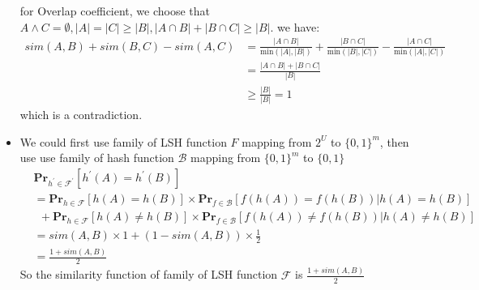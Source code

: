 \documentclass[12pt]{article}
\newenvironment{solution}[2][Solution]{\begin{trivlist}
\item[\hskip \labelsep {\bfseries #1}\hskip \labelsep {\bfseries #2.}]}{\end{trivlist}}
\begin{document}
\begin{solution}{3}
\begin{itemize}
              for Overlap coefficient, we choose that $A \land C = \emptyset, |A|=|C| \ge |B|, |A \cap B| + |B \cap C| \ge |B|$. we have:
              \begin{align*}
                  sim(A, B) + sim(B, C) - sim(A, C) & = \frac{|A \cap B|}{\text{min}(|A|,|B|)} + \frac{|B \cap C|}{\text{min}(|B|,|C|)} - \frac{|A \cap C|}{\text{min}(|A|,|C|)} \\
                                                    & = \frac{|A \cap B| + |B \cap C|}{|B|}                                                                                      \\
                                                    & \ge \frac{|B|}{|B|} = 1
              \end{align*}
              which is a contradiction.
        \item We could first use family of LSH function $F$ mapping from $2^U$ to $\{0,1\}^m$, then use use family of hash function $\mathcal{B}$
              mapping from $\{0,1\}^m$ to $\{0,1\}$
              \begin{align*}
                   & \mathbf{Pr}_{h^\prime \in \mathcal{F}^\prime}[h^\prime(A) = h^\prime(B)]                                                          \\
                   & = \mathbf{Pr}_{h \in \mathcal{F}}[h(A) = h(B)] \times \mathbf{Pr}_{f \in \mathcal{B}}[f(h(A)) = f(h(B))|h(A) = h(B)]              \\
                   & ~ ~ + \mathbf{Pr}_{h \in \mathcal{F}}[h(A) \neq h(B)] \times \mathbf{Pr}_{f \in \mathcal{B}}[f(h(A)) \neq f(h(B))|h(A) \neq h(B)] \\
                   & = sim(A, B) \times 1 + (1-sim(A, B)) \times \frac12                                                                               \\
                   & = \frac{1+sim(A,B)}{2}
              \end{align*}
              So the similarity function of family of LSH function $\mathcal{F}$ is $\frac{1+sim(A,B)}{2}$
    \end{itemize}
\end{solution}
\end{document}
